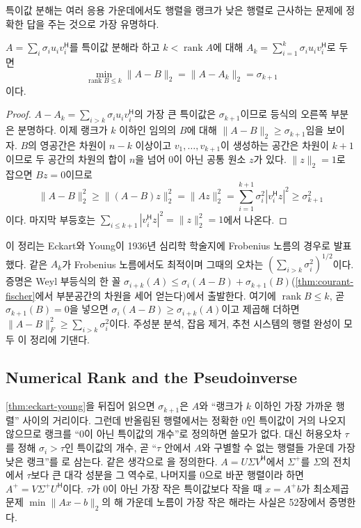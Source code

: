 특이값 분해는 여러 응용 가운데에서도 행렬을 랭크가 낮은 행렬로 근사하는 문제에 정확한 답을 주는 것으로 가장 유명하다.

\begin{theorem}
\label{thm:eckart-young}
$A=\sum_{i}\sigma_iu_iv_i^{\mathsf H}$를 특이값 분해라 하고 $k<\operatorname{rank}A$에 대해 $A_k=\sum_{i=1}^k\sigma_iu_iv_i^{\mathsf H}$로 두면
\[
\min_{\operatorname{rank}B\le k}\|A-B\|_2=\|A-A_k\|_2=\sigma_{k+1}
\]
이다.
\end{theorem}

\begin{proof}
$A-A_k=\sum_{i>k}\sigma_iu_iv_i^{\mathsf H}$의 가장 큰 특이값은 $\sigma_{k+1}$이므로 등식의 오른쪽 부분은 분명하다. 이제 랭크가 $k$ 이하인 임의의 $B$에 대해 $\|A-B\|_2\ge\sigma_{k+1}$임을 보이자. $B$의 영공간은 차원이 $n-k$ 이상이고 $v_1,\dots,v_{k+1}$이 생성하는 공간은 차원이 $k+1$이므로 두 공간의 차원의 합이 $n$을 넘어 $0$이 아닌 공통 원소 $z$가 있다. $\|z\|_2=1$로 잡으면 $Bz=0$이므로
\[
\|A-B\|_2^2\ge\|(A-B)z\|_2^2=\|Az\|_2^2=\sum_{i=1}^{k+1}\sigma_i^2|v_i^{\mathsf H}z|^2\ge\sigma_{k+1}^2
\]
이다. 마지막 부등호는 $\sum_{i\le k+1}|v_i^{\mathsf H}z|^2=\|z\|_2^2=1$에서 나온다.
\end{proof}

이 정리는 Eckart와 Young이 1936년 심리학 학술지에 Frobenius 노름의 경우로 발표했다\cite{eckart1936young}. 같은 $A_k$가 Frobenius 노름에서도 최적이며 그때의 오차는 $(\sum_{i>k}\sigma_i^2)^{1/2}$이다. 증명은 Weyl 부등식의 한 꼴 $\sigma_{i+k}(A)\le\sigma_i(A-B)+\sigma_{k+1}(B)$(\cref{thm:courant-fischer}에서 부분공간의 차원을 세어 얻는다)에서 출발한다. 여기에 $\operatorname{rank}B\le k$, 곧 $\sigma_{k+1}(B)=0$을 넣으면 $\sigma_i(A-B)\ge\sigma_{i+k}(A)$이고 제곱해 더하면 $\|A-B\|_F^2\ge\sum_{i>k}\sigma_i^2$이다. 주성분 분석, 잡음 제거, 추천 시스템의 행렬 완성이 모두 이 정리에 기댄다.

\subsection{Numerical Rank and the Pseudoinverse}

\cref{thm:eckart-young}을 뒤집어 읽으면 $\sigma_{k+1}$은 $A$와 ``랭크가 $k$ 이하인 가장 가까운 행렬'' 사이의 거리이다. 그런데 반올림된 행렬에서는 정확한 $0$인 특이값이 거의 나오지 않으므로 랭크를 ``$0$이 아닌 특이값의 개수''로 정의하면 쓸모가 없다. 대신 허용오차 $\tau$를 정해 $\sigma_i>\tau$인 특이값의 개수, 곧 ``$\tau$ 안에서 $A$와 구별할 수 없는 행렬들 가운데 가장 낮은 랭크''를 로 삼는다. 같은 생각으로 을 정의한다. $A=U\Sigma V^{\mathsf H}$에서 $\Sigma^+$를 $\Sigma$의 전치에서 $\tau$보다 큰 대각 성분을 그 역수로, 나머지를 $0$으로 바꾼 행렬이라 하면 $A^+=V\Sigma^+U^{\mathsf H}$이다. $\tau$가 $0$이 아닌 가장 작은 특이값보다 작을 때 $x=A^+b$가 최소제곱 문제 $\min\|Ax-b\|_2$의 해 가운데 노름이 가장 작은 해라는 사실은 52장에서 증명한다.

